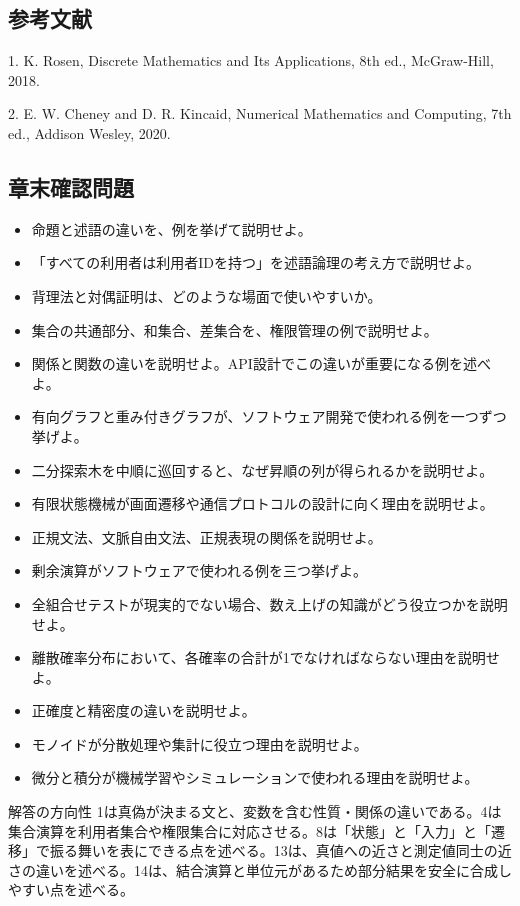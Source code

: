 \documentclass[a4paper,11pt]{ltjsarticle}
\numberwithin{figure}{section}
\numberwithin{table}{section}
\begin{document}
\subsection{参考文献}
1. K. Rosen, Discrete Mathematics and Its Applications, 8th ed., McGraw-Hill, 2018.

2. E. W. Cheney and D. R. Kincaid, Numerical Mathematics and Computing, 7th ed., Addison Wesley, 2020.

\subsection{章末確認問題}
\begin{itemize}[leftmargin=2em]
\item 命題と述語の違いを、例を挙げて説明せよ。
\item 「すべての利用者は利用者IDを持つ」を述語論理の考え方で説明せよ。
\item 背理法と対偶証明は、どのような場面で使いやすいか。
\item 集合の共通部分、和集合、差集合を、権限管理の例で説明せよ。
\item 関係と関数の違いを説明せよ。API設計でこの違いが重要になる例を述べよ。
\item 有向グラフと重み付きグラフが、ソフトウェア開発で使われる例を一つずつ挙げよ。
\item 二分探索木を中順に巡回すると、なぜ昇順の列が得られるかを説明せよ。
\item 有限状態機械が画面遷移や通信プロトコルの設計に向く理由を説明せよ。
\item 正規文法、文脈自由文法、正規表現の関係を説明せよ。
\item 剰余演算がソフトウェアで使われる例を三つ挙げよ。
\item 全組合せテストが現実的でない場合、数え上げの知識がどう役立つかを説明せよ。
\item 離散確率分布において、各確率の合計が1でなければならない理由を説明せよ。
\item 正確度と精密度の違いを説明せよ。
\item モノイドが分散処理や集計に役立つ理由を説明せよ。
\item 微分と積分が機械学習やシミュレーションで使われる理由を説明せよ。
\end{itemize}
\begin{notebox}{解答の方向性}
1は真偽が決まる文と、変数を含む性質・関係の違いである。4は集合演算を利用者集合や権限集合に対応させる。8は「状態」と「入力」と「遷移」で振る舞いを表にできる点を述べる。13は、真値への近さと測定値同士の近さの違いを述べる。14は、結合演算と単位元があるため部分結果を安全に合成しやすい点を述べる。
\end{notebox}
\end{document}
